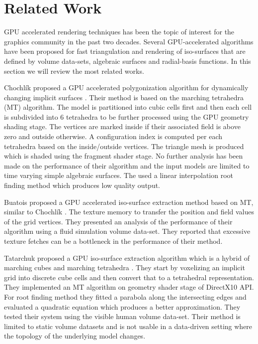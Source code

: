 \section{Related Work}
GPU accelerated rendering techniques has been the topic of interest for the graphics community in the past two decades.
Several GPU-accelerated algorithms have been proposed for fast triangulation and rendering of iso-surfaces that are defined by
volume data-sets, algebraic surfaces and radial-basis functions. In this section we will review the most related works.

Chochl{\'i}k \etal proposed a GPU accelerated polygonization algorithm for dynamically changing implicit surfaces \cite{chochlik2012gpu}. 
Their method is based on the marching tetrahedra (MT) algorithm. The model is partitioned into cubic cells first and then each cell is 
subdivided into 6 tetrahedra to be further processed using the GPU geometry shading stage. The vertices are marked inside if their 
associated field is above zero and outside otherwise. A configuration index is computed per each tetrahedra based on the inside/outside 
vertices. The triangle mesh is produced which is shaded using the fragment shader stage. No further analysis has been made on the performance 
of their algorithm and the input models are limited to time varying simple algebraic surfaces. The used a linear interpolation root finding
method which produces low quality output. 

Buatois \etal proposed a GPU accelerated iso-surface extraction method based on MT, similar to Chochl{\'i}k \etal \cite{Buatois2006}. The 
texture memory to transfer the position and field values of the grid vertices. They presented an analysis of the performance of their algorithm
using a fluid simulation volume data-set. They reported that excessive texture fetches can be a bottleneck in the performance of their method.


Tatarchuk \etal proposed a GPU iso-surface extraction algorithm which is a hybrid of marching cubes and marching tetrahedra \cite{Tatarchuk2007}. 
They start by voxelizing an implicit grid into discrete cube cells and then convert that to a tetrahedral representation. They implemented an MT 
algorithm on geometry shader stage of DirectX10 API. For root finding method they fitted a parabola along the intersecting edges and evaluated a 
quadratic equation which produces a better approximation. They tested their system using the visible human volume data-set. Their method
is limited to static volume datasets and is not usable in a data-driven setting where the topology of the underlying model changes. 

